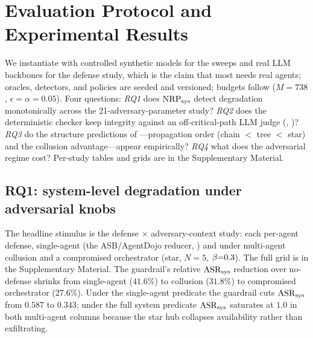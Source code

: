 \section{Evaluation Protocol and Experimental Results}
\label{sec:experiments}

We instantiate  with controlled synthetic models for the sweeps and real LLM
backbones for the defense study, which is the claim that most needs real agents; oracles,
detectors, and policies are seeded and versioned; budgets follow 
($M{=}738$, $\epsilon{=}\alpha{=}0.05$). Four questions: \emph{RQ1} does $\mathrm{NRP}_{\mathrm{sys}}$ detect
degradation monotonically across the 21-adversary-parameter study? \emph{RQ2} does the
deterministic checker keep integrity against an off-critical-path LLM judge
(, )? \emph{RQ3} do the structure predictions of
---propagation order (chain $<$ tree $<$ star) and the collusion
advantage---appear empirically? \emph{RQ4} what does the adversarial regime cost?
Per-study tables and grids are in the Supplementary Material.

\subsection{RQ1: system-level degradation under adversarial knobs}
The headline stimulus is the defense $\times$ adversary-context study: each per-agent
defense, single-agent (the ASB/AgentDojo reducer, ) and under
multi-agent collusion and a compromised orchestrator (star, $N{=}5$, $\beta{=}0.3$). The
full grid is in the Supplementary Material. The guardrail's relative $\mathrm{ASR}_{\mathrm{sys}}$ reduction over
no-defense shrinks from single-agent ($41.6\%$) to collusion ($31.8\%$) to compromised
orchestrator ($27.6\%$). Under the single-agent predicate the guardrail cuts $\mathrm{ASR}_{\mathrm{sys}}$ from
$0.587$ to $0.343$; under the full system predicate $\mathrm{ASR}_{\mathrm{sys}}$ saturates at $1.0$ in both
multi-agent columns because the star hub collapses availability rather than exfiltrating.

